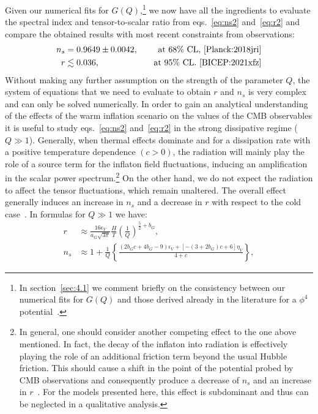 \documentclass[a4paper,11pt]{article}
\begin{document}
Given our numerical fits for $G(Q)$,\footnote{In section~\ref{sec:4.1} we comment briefly on the consistency between our numerical fits for $G(Q)$ and those derived already in the literature for a $\phi^4$ potential~\cite{Bastero-Gil:2016qru, Benetti:2016jhf}.} we now have all the ingredients to evaluate the spectral index and tensor-to-scalar ratio from eqs.~\eqref{eq:ns2} and~\eqref{eq:r2} and compare the obtained results with most recent constraints from observations:
\begin{align}
    n_s & = 0.9649\pm 0.0042,& \quad \text{at 68\% CL,~\cite{Planck:2018jri}} \label{eq:ns_Planck} \\
    r &\lesssim 0.036, & \quad \text{at 95\% CL.~\cite{BICEP:2021xfz}} \label{eq:r_Planck}
\end{align}
Without making any further assumption on the strength of the parameter $Q$, the system of equations that we need to evaluate to obtain $r$ and $n_s$ is very complex and can only be solved numerically. In order to gain an analytical understanding of the effects of the warm inflation scenario on the values of the CMB observables it is useful to study eqs.~\eqref{eq:ns2} and~\eqref{eq:r2} in the strong dissipative regime ($Q \gg 1$). Generally, when thermal effects dominate and for a dissipation rate with a positive temperature dependence $(c>0)$, the radiation will mainly play the role of a source term for the inflaton field fluctuations, inducing an amplification in
the scalar power spectrum.\footnote{In general, one should consider another competing effect to the one above mentioned. In fact, the decay of the inflaton into radiation is effectively playing the role of an additional friction term beyond the usual Hubble friction. This should cause a shift in the point of the potential probed by CMB observations and consequently produce a decrease of $n_s$ and an increase in $r$~\cite{Berera:2018tfc}. For the models presented here, this effect is subdominant and thus can be neglected in a qualitative analysis.} On the other hand, we do not expect  the radiation to affect the tensor fluctuations, which remain unaltered. The overall effect generally induces an increase in $n_s$ and a decrease in $r$ with respect to the cold case~\cite{Berera:2018tfc}. In formulas for $Q \gg 1$ we have:
\begin{align}
    r&\approx \frac{16 \epsilon_V}{a_G\sqrt{3\pi}}\frac{H}{T}\left(\frac{1}{Q}\right)^{\frac{5}{2}+b_G},\label{eq:r_SR} \\
    n_s&\approx1+\frac{1}{Q}\left\{\frac{(2b_G c+4b_G-9)\epsilon_V+[-(3+2b_G)c+6]\eta_V}{4+c}\right\}, \label{eq:ns_SR}
\end{align}
\end{document}
